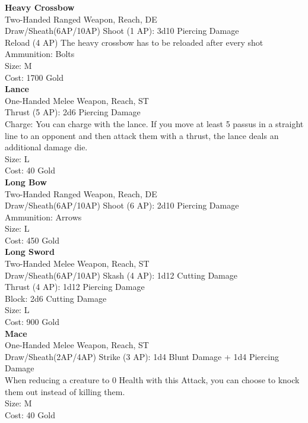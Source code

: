 \textbf{Heavy Crossbow}\label{weapon:heavyCrossbow}\\
Two-Handed Ranged Weapon,  Reach, DE\\
Draw/Sheath(6AP/10AP)
Shoot (1 AP): 3d10 Piercing Damage\\
Reload (4 AP) The heavy crossbow has to be reloaded after every shot\\
Ammunition: Bolts\\
Size: M\\
Cost: 1700 Gold\\

\textbf{Lance}\label{weapon:lance}\\
One-Handed Melee Weapon,  Reach, ST\\
Thrust (5 AP): 2d6 Piercing Damage\\
Charge: You can charge with the lance.
If you move at least 5 passus in a straight line to an opponent and then attack them with a thrust, the lance deals an additional damage die.\\
Size: L\\
Cost: 40 Gold\\

\textbf{Long Bow}\label{weapon:longBow}\\
Two-Handed Ranged Weapon,  Reach, DE\\
Draw/Sheath(6AP/10AP)
Shoot (6 AP): 2d10 Piercing Damage\\
Ammunition: Arrows\\
Size: L\\
Cost: 450 Gold\\

\textbf{Long Sword}\label{weapon:longSword}\\
Two-Handed Melee Weapon,  Reach, ST\\
Draw/Sheath(6AP/10AP)
Skash (4 AP): 1d12 Cutting Damage\\
Thrust (4 AP): 1d12 Piercing Damage\\
Block: 2d6 Cutting Damage\\
Size: L\\
Cost: 900 Gold\\

\textbf{Mace}\label{weapon:mace}\\
One-Handed Melee Weapon,  Reach, ST\\
Draw/Sheath(2AP/4AP)
Strike (3 AP): 1d4 Blunt Damage + 1d4 Piercing Damage\\
When reducing a creature to 0 Health with this Attack, you can choose to knock them out instead of killing them.\\
Size: M\\
Cost: 40 Gold\\

